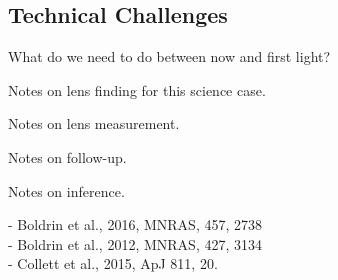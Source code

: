 \documentclass{article}
\begin{document}
\subsection{Technical Challenges}

What do we need to do between now and first light?

Notes on lens finding for this science case.

Notes on lens measurement.

Notes on follow-up.

Notes on inference.






- Boldrin et al., 2016, MNRAS, 457, 2738\\
- Boldrin et al., 2012, MNRAS, 427, 3134\\
- Collett et al., 2015, ApJ 811, 20.\\
\end{document}
